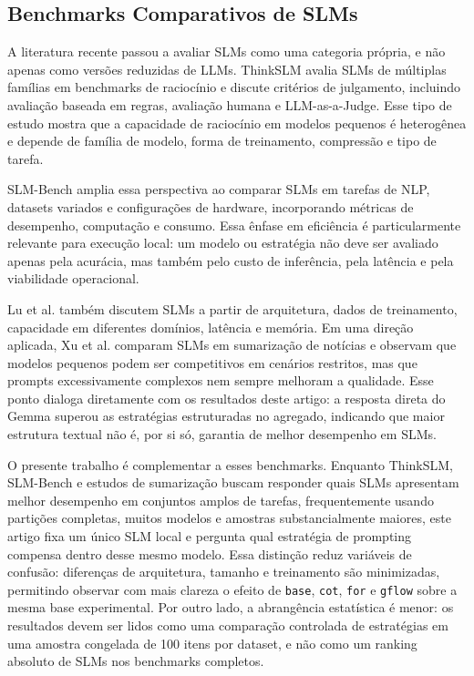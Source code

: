 \documentclass[12pt]{article}
\begin{document}
\subsection{Benchmarks Comparativos de SLMs}

A literatura recente passou a avaliar SLMs como uma categoria própria, e não apenas como versões reduzidas de LLMs. ThinkSLM \cite{thinkslm2025} avalia SLMs de múltiplas famílias em benchmarks de raciocínio e discute critérios de julgamento, incluindo avaliação baseada em regras, avaliação humana e LLM-as-a-Judge. Esse tipo de estudo mostra que a capacidade de raciocínio em modelos pequenos é heterogênea e depende de família de modelo, forma de treinamento, compressão e tipo de tarefa.

SLM-Bench \cite{slmbench2025} amplia essa perspectiva ao comparar SLMs em tarefas de NLP, datasets variados e configurações de hardware, incorporando métricas de desempenho, computação e consumo. Essa ênfase em eficiência é particularmente relevante para execução local: um modelo ou estratégia não deve ser avaliado apenas pela acurácia, mas também pelo custo de inferência, pela latência e pela viabilidade operacional.

Lu et al. \cite{lu2024slmsurvey} também discutem SLMs a partir de arquitetura, dados de treinamento, capacidade em diferentes domínios, latência e memória. Em uma direção aplicada, Xu et al. \cite{xu2025news} comparam SLMs em sumarização de notícias e observam que modelos pequenos podem ser competitivos em cenários restritos, mas que prompts excessivamente complexos nem sempre melhoram a qualidade. Esse ponto dialoga diretamente com os resultados deste artigo: a resposta direta do Gemma superou as estratégias estruturadas no agregado, indicando que maior estrutura textual não é, por si só, garantia de melhor desempenho em SLMs.

O presente trabalho é complementar a esses benchmarks. Enquanto ThinkSLM, SLM-Bench e estudos de sumarização buscam responder quais SLMs apresentam melhor desempenho em conjuntos amplos de tarefas, frequentemente usando partições completas, muitos modelos e amostras substancialmente maiores, este artigo fixa um único SLM local e pergunta qual estratégia de prompting compensa dentro desse mesmo modelo. Essa distinção reduz variáveis de confusão: diferenças de arquitetura, tamanho e treinamento são minimizadas, permitindo observar com mais clareza o efeito de \texttt{base}, \texttt{cot}, \texttt{for} e \texttt{gflow} sobre a mesma base experimental. Por outro lado, a abrangência estatística é menor: os resultados devem ser lidos como uma comparação controlada de estratégias em uma amostra congelada de 100 itens por dataset, e não como um ranking absoluto de SLMs nos benchmarks completos.
\end{document}
